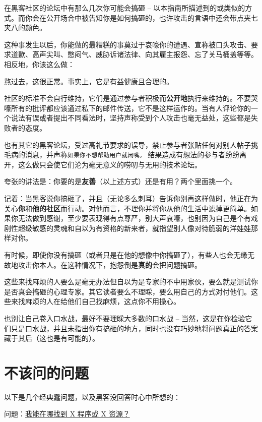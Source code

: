 \documentclass[titlepage]{article}
\begin{document}
在黑客社区的论坛中有那么几次你可能会搞砸 --
以本指南所描述到的或类似的方式。而你会在公开场合中被告知你是如何搞砸的，也许攻击的言语中还会带点夹七夹八的颜色。

这种事发生以后，你能做的最糟糕的事莫过于哀嚎你的遭遇、宣称被口头攻击、要求道歉、高声尖叫、憋闷气、威胁诉诸法律、向其雇主报怨、忘了关马桶盖等等。相反地，你该这么做：

熬过去，这很正常。事实上，它是有益健康且合理的。

社区的标准不会自行维持，它们是通过参与者积极而\textbf{公开地}执行来维持的。不要哭嚎所有的批评都应该通过私下的邮件传送，它不是这样运作的。当有人评论你的一个说法有误或者提出不同看法时，坚持声称受到个人攻击也毫无益处，这些都是失败者的态度。

也有其它的黑客论坛，受过高礼节要求的误导，禁止参与者张贴任何对别人帖子挑毛病的消息，并声称\texttt{如果你不想帮助用户就闭嘴。}
结果造成有想法的参与者纷纷离开，这么做只会使它们沦为毫无意义的唠叨与无用的技术论坛。

夸张的讲法是：你要的是\textbf{友善}（以上述方式）还是有用？两个里面挑一个。

记着：当黑客说你搞砸了，并且（无论多么刺耳）告诉你别再这样做时，他正在为关心\textbf{你}和\textbf{他的社区}而行动。对他而言，不理你并将你从他的生活中滤掉更简单。如果你无法做到感谢，至少要表现得有点尊严，别大声哀嚎，也别因为自己是个有戏剧性超级敏感的灵魂和自以为有资格的新来者，就指望别人像对待脆弱的洋娃娃那样对你。

有时候，即使你没有搞砸（或者只是在他的想像中你搞砸了），有些人也会无缘无故地攻击你本人。在这种情况下，抱怨倒是\textbf{真的}会把问题搞砸。

这些来找麻烦的人要么是毫无办法但自以为是专家的不中用家伙，要么就是测试你是否真会搞砸的心理专家。其它读者要么不理睬，要么用自己的方式对付他们。这些来找麻烦的人在给他们自己找麻烦，这点你不用操心。

也别让自己卷入口水战，最好不要理睬大多数的口水战 --
当然，这是在你检验它们只是口水战，并且未指出你有搞砸的地方，同时也没有巧妙地将问题真正的答案藏于其后（这也是有可能的）。

\hypertarget{ux4e0dux8be5ux95eeux7684ux95eeux9898}{\section{不该问的问题}\label{ux4e0dux8be5ux95eeux7684ux95eeux9898}}

以下是几个经典蠢问题，以及黑客没回答时心中所想的：

问题：\protect\hyperlink{q1}{我能在哪找到 X 程序或 X 资源？}
\end{document}
